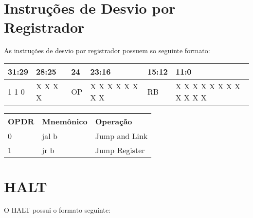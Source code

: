 \documentclass{report}
\begin{document}
\section{Instruções de Desvio por Registrador}
As instruções de desvio por registrador possuem so seguinte formato:

   \FloatBarrier
    \begin{table}[H]
      \begin{center}
        \begin{tabular}[pos]{|m{2cm}|m{2cm}|m{1cm}|m{3cm}|m{1cm}|m{5cm}|} 
          \hline
          \cellcolor[gray]{0.9}\textbf{31:29} & 
          \cellcolor[gray]{0.9}\textbf{28:25} &
          \cellcolor[gray]{0.9}\textbf{24} &
          \cellcolor[gray]{0.9}\textbf{23:16} &
          \cellcolor[gray]{0.9}\textbf{15:12} &
          \cellcolor[gray]{0.9}\textbf{11:0} \\ \hline
            1 1 0 & X X X X & OP & X X X X X X X X & RB & X X X X X X X X X X X X \\ \hline
        \end{tabular}
      \end{center}
    \end{table}  

   \FloatBarrier
    \begin{table}[H]
      \begin{center}
        \begin{tabular}[pos]{|m{4cm}|m{4cm}|m{7cm}|} 
          \hline
          \cellcolor[gray]{0.9}\textbf{OPDR} & 
          \cellcolor[gray]{0.9}\textbf{Mnemônico} &
          \cellcolor[gray]{0.9}\textbf{Operação} \\ \hline
            0 & jal b & Jump and Link \\ \hline
            1 & jr b & Jump Register \\ \hline
        \end{tabular}
      \end{center}
    \end{table}  
  
  
\section{HALT}
O HALT possui o formato seguinte:
\end{document}
